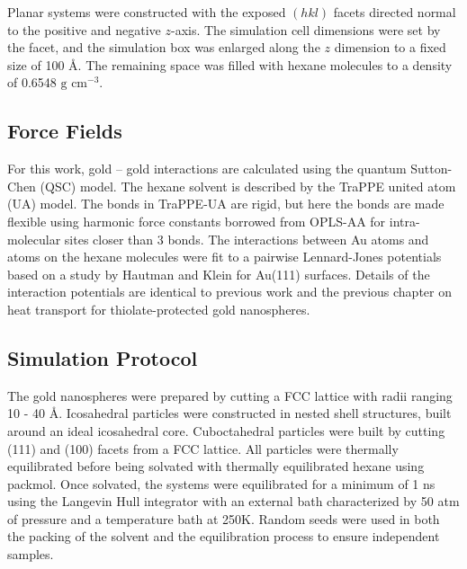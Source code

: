 Planar systems were constructed with the exposed $(hkl)$ facets
directed normal to the positive and negative $z$-axis.  The simulation
cell dimensions were set by the facet, and the simulation box was
enlarged along the $z$ dimension to a fixed size of 100 \AA.  The
remaining space was filled with hexane molecules to a density of
0.6548 $\text{g cm}^{-3}$.


\subsection{Force Fields}

For this work, gold -- gold interactions are calculated using the
quantum Sutton-Chen (QSC) model.\cite{Qi:1999ph} The hexane solvent is
described by the TraPPE united atom (UA)
model.\cite{TraPPE-UA.alkanes} The bonds in TraPPE-UA are rigid, but
here the bonds are made flexible using harmonic force constants
borrowed from OPLS-AA for intra-molecular sites closer than 3
bonds.\cite{Jorgensen98a} The interactions between Au atoms and atoms
on the hexane molecules were fit to a pairwise Lennard-Jones
potentials based on a study by Hautman and Klein for Au(111)
surfaces.\cite{hautman:4994} Details of the interaction potentials are
identical to previous work and the previous chapter on heat 
transport for thiolate-protected gold nanospheres.\cite{Stocker2016}

\subsection{Simulation Protocol}
The gold nanospheres were prepared by cutting a FCC lattice with radii ranging
10 - 40 \AA. 
Icosahedral particles were
constructed in nested shell structures, built around an ideal
icosahedral core.  Cuboctahedral particles were built by cutting (111)
and (100) facets from a FCC lattice.
All particles were thermally equilibrated before being
solvated with thermally equilibrated hexane using packmol.\cite{packmol}
Once solvated, the systems were equilibrated for a minimum of 1 ns 
using the Langevin Hull 
integrator with an external bath characterized by 50 atm of
pressure and a temperature bath at 250K.\cite{Vardeman2011}
Random seeds were used in both the packing of the solvent and the equilibration process to ensure independent samples.

